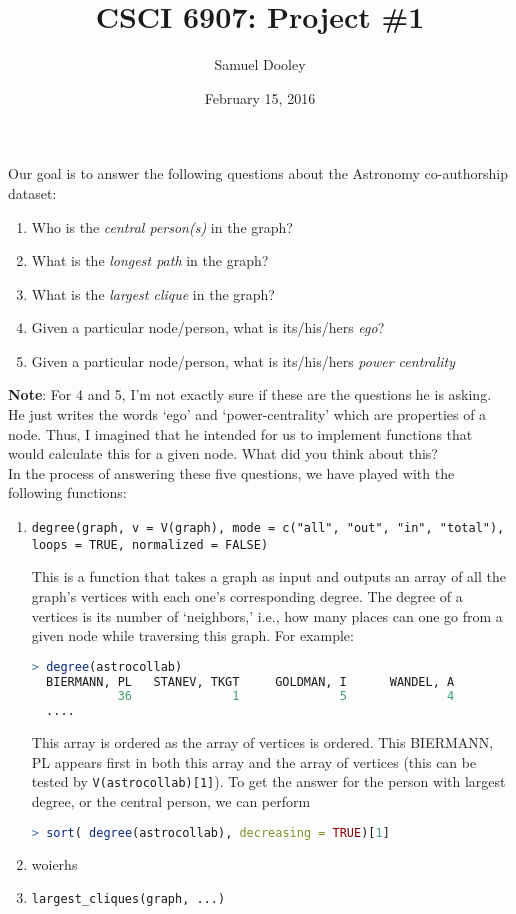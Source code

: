 \documentclass{article}
\title{CSCI 6907: Project \#1}
\author{Samuel Dooley}
\date{February 15, 2016}
\begin{document}
\maketitle

\noindent Our goal is to answer the following questions about the Astronomy co-authorship dataset:
\begin{enumerate}
	\item Who is the \emph{central person(s)} in the graph?
	\item What is the \emph{longest path} in the graph?
	\item What is the \emph{largest clique} in the graph?
	\item Given a particular node/person, what is its/his/hers \emph{ego}? 
	\item Given a particular node/person, what is its/his/hers \emph{power centrality}
\end{enumerate}

\color{ForestGreen}
\noindent \textbf{Note}: For 4 and 5, I'm not exactly sure if these are the questions he is asking. He just writes the words `ego' and `power-centrality' which are properties of a node. 
Thus, I imagined that he intended for us to implement functions that would calculate this for a given node. What did you think about this?
\\

\color{Black}
In the process of answering these five questions, we have played with the following functions:

\begin{enumerate}

	\item \texttt{degree(graph, v = V(graph), mode = c("all", "out", "in", "total"),
  				      loops = TRUE, normalized = FALSE)}
	
		This is a function that takes a graph as input and outputs an array of all the graph's vertices with each one's corresponding degree. The degree of a vertices is its number of `neighbors,' i.e., how many places can one go from a given node while traversing this graph. For example:
\begin{lstlisting}[language=R]
> degree(astrocollab)
  BIERMANN, PL   STANEV, TKGT     GOLDMAN, I      WANDEL, A 
            36              1              5              4 
  ....
		\end{lstlisting}
		This array is ordered as the array of vertices is ordered. This BIERMANN, PL appears first in both this array and the array of vertices (this can be tested by \texttt{V(astrocollab)[1]}). To get the answer for the person with largest degree, or the central person, we can perform 
\begin{lstlisting}[language=R]
> sort( degree(astrocollab), decreasing = TRUE)[1]
		\end{lstlisting}


	\item woierhs
	\item \texttt{largest\_cliques(graph, ...)}
\end{enumerate}
\end{document}
